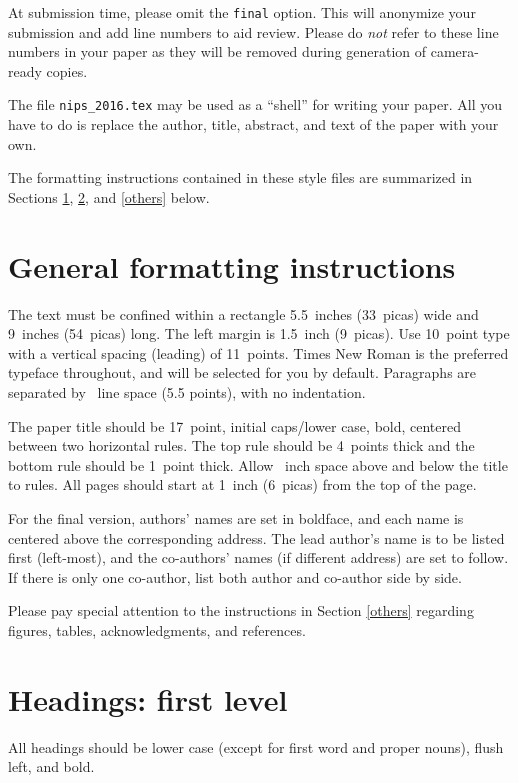 \documentclass{article}
\begin{document}
At submission time, please omit the \verb+final+ option. This will
anonymize your submission and add line numbers to aid review.  Please
do \emph{not} refer to these line numbers in your paper as they will
be removed during generation of camera-ready copies.

The file \verb+nips_2016.tex+ may be used as a ``shell'' for writing
your paper. All you have to do is replace the author, title, abstract,
and text of the paper with your own.

The formatting instructions contained in these style files are
summarized in Sections \ref{gen_inst}, \ref{headings}, and
\ref{others} below.

\section{General formatting instructions}
\label{gen_inst}

The text must be confined within a rectangle 5.5~inches (33~picas)
wide and 9~inches (54~picas) long. The left margin is 1.5~inch
(9~picas).  Use 10~point type with a vertical spacing (leading) of
11~points.  Times New Roman is the preferred typeface throughout, and
will be selected for you by default.  Paragraphs are separated by
~line space (5.5 points), with no indentation.

The paper title should be 17~point, initial caps/lower case, bold,
centered between two horizontal rules. The top rule should be 4~points
thick and the bottom rule should be 1~point thick. Allow
~inch space above and below the title to rules. All
pages should start at 1~inch (6~picas) from the top of the page.

For the final version, authors' names are set in boldface, and each
name is centered above the corresponding address. The lead author's
name is to be listed first (left-most), and the co-authors' names (if
different address) are set to follow. If there is only one co-author,
list both author and co-author side by side.

Please pay special attention to the instructions in Section \ref{others}
regarding figures, tables, acknowledgments, and references.

\section{Headings: first level}
\label{headings}

All headings should be lower case (except for first word and proper
nouns), flush left, and bold.
\end{document}
